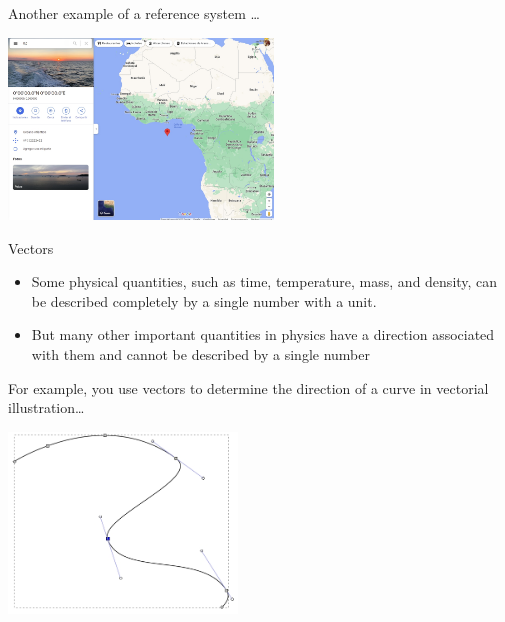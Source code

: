 \documentclass[]{beamer}
\begin{document}
   \begin{frame}
   
      Another example of a reference system \dots
 
      \begin{center}
       \includegraphics[height=1.9in]{images/reference_map.jpg}
     \end{center}
 

      \end{frame}
    

    
    
  \begin{frame}
   Vectors
   
   \begin{itemize}
   \item Some physical quantities, such as time, temperature, mass, and density, can be
   described completely by a single number with a unit.
   \pause
   \item But many other important quantities in physics have a direction associated with them and cannot be
   described by a single number %
   \end{itemize}
   
   
   
    \end{frame}

    
    
  \begin{frame}
For example, you use vectors to determine the direction of a curve in vectorial illustration\dots \pause

\begin{center}
   \includegraphics[height=1.9in]{images/vectorial_illustration.jpg}
 \end{center}
   
   
    \end{frame}
\end{document}
